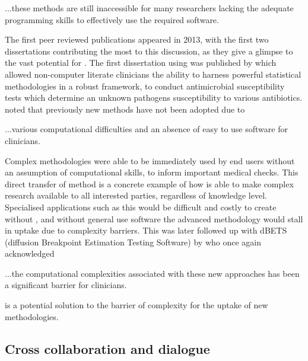 \begin{displayquote}
	...these methods are still inaccessible for many researchers lacking the adequate programming skills to effectively use the required software.
\end{displayquote}

The first peer reviewed  publications appeared in 2013, with the first two dissertations contributing the most to this discussion, as they give a glimpse to the vast potential for .  The first dissertation using  was published by \citet{depalma_disk_2013} which allowed non-computer literate clinicians the ability to harness powerful statistical methodologies in a robust framework, to conduct antimicrobial susceptibility tests which determine an unknown pathogens susceptibility to various antibiotics.  \citet{depalma_disk_2013} noted that previously new methods have not been adopted due to

\begin{displayquote}
	...various computational difficulties and an absence of easy to use software for clinicians.
\end{displayquote}

Complex methodologies were able to be immediately used by end users without an assumption of computational skills, to inform important medical checks.  This direct transfer of method is a concrete example of how  is able to make complex research available to all interested parties, regardless of knowledge level.  Specialised applications such as this would be difficult and costly to create without , and without general use software the advanced methodology would stall in uptake due to complexity barriers.  This was later followed up with dBETS (diffusion Breakpoint Estimation Testing Software) by \citet{depalma_determination_2017} who once again acknowledged

\begin{displayquote}
	...the computational complexities associated with these new approaches has been a significant barrier for clinicians.
\end{displayquote}

 is a potential solution to the barrier of complexity for the uptake of new methodologies.  

\subsection{Cross collaboration and dialogue}

